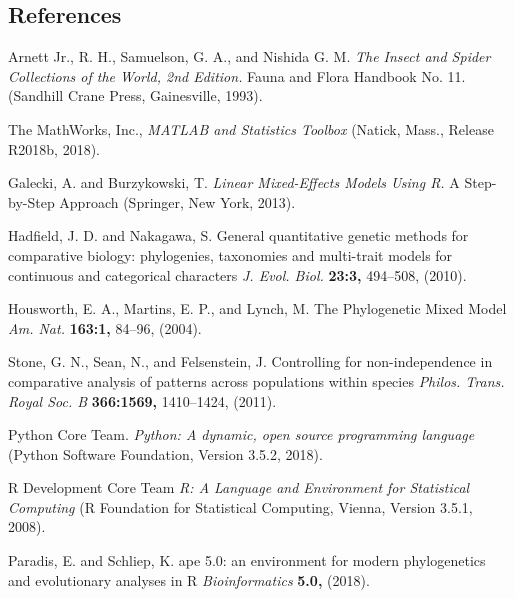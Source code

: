 \documentclass[twocolumn, linenumbers, superscriptaddress, nofootinbib]{revtex4-1}
\begin{document}
	\begin{thebibliography}{50}
		\makeatletter
		\addtocounter{NAT@ctr}{45}
		\makeatother
		\section*{References}	
				Arnett Jr., R. H., Samuelson, G. A., and Nishida G. M.
				\textit{The Insect and Spider Collections of the World, 2nd Edition.}
				Fauna and Flora Handbook No. 11.
				(Sandhill Crane Press,
				Gainesville,
				1993).
			
				The MathWorks, Inc.,
				\textit{MATLAB and Statistics Toolbox}
				(Natick, Mass.,
				Release R2018b,
				2018).
			
				Galecki, A. and Burzykowski, T.
				\textit{Linear Mixed-Effects Models Using R.}
				A Step-by-Step Approach
				(Springer,
				New York,
				2013).
			
				Hadfield, J. D. and Nakagawa, S.
				General quantitative genetic methods for comparative biology: phylogenies, taxonomies and multi-trait models for continuous and categorical characters
				\textit{J. Evol. Biol.}
				\textbf{23:3,}
				494--508,
				(2010).
			
				Housworth, E. A., Martins, E. P., and Lynch, M.
				The Phylogenetic Mixed Model
				\textit{Am. Nat.}
				\textbf{163:1,}
				84--96,
				(2004).
			
				Stone, G. N., Sean, N., and Felsenstein, J.
				Controlling for non-independence in comparative analysis of patterns across populations within species
				\textit{Philos. Trans. Royal Soc. B}
				\textbf{366:1569,}
				1410--1424,
				(2011).
			
				Python Core Team.
				\textit{Python: A dynamic, open source programming language}
				(Python Software Foundation, 
				Version 3.5.2,
				2018).
			
				R Development Core Team
				\textit{R: A Language and Environment for Statistical Computing}
				(R Foundation for Statistical Computing,
				Vienna,
				Version 3.5.1,
				2008).
			
				Paradis, E. and Schliep, K.
				ape 5.0: an environment for modern phylogenetics and evolutionary analyses in R
				\textit{Bioinformatics}
				\textbf{5.0,}
				(2018).
			

\end{thebibliography}
\end{document}
